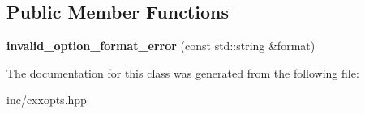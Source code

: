 \subsection*{Public Member Functions}
\begin{DoxyCompactItemize}
\item 
{\bfseries invalid\+\_\+option\+\_\+format\+\_\+error} (const std\+::string \&format)\hypertarget{classcxxopts_1_1invalid__option__format__error_ae31d4f488bbee0eebe50e7c8949a6fb6}{}\label{classcxxopts_1_1invalid__option__format__error_ae31d4f488bbee0eebe50e7c8949a6fb6}

\end{DoxyCompactItemize}


The documentation for this class was generated from the following file\+:\begin{DoxyCompactItemize}
\item 
inc/cxxopts.\+hpp\end{DoxyCompactItemize}
